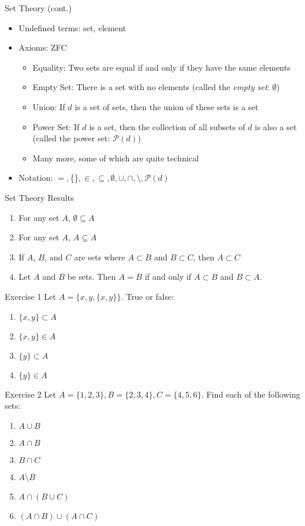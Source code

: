 \documentclass{beamer}
\begin{document}
\begin{frame}{Set Theory (cont.)}
\begin{itemize}
\item Undefined terms: set, element
\item Axioms: ZFC
\begin{itemize}
\item Equality: Two sets are equal if and only if they have the same elements
\item Empty Set: There is a set with no elements (called the \emph{empty set}: $\emptyset$)
\item Union: If $d$ is a set of sets, then the union of these sets is a set
\item Power Set: If $d$ is a set, then the collection of all subsets of $d$ is also a set (called the power set: $\mathcal{P}(d)$)
\item Many more, some of which are quite technical
\end{itemize}
\item Notation: $=, $\{\}$, \in, \subseteq, \emptyset, \cup, \cap, \setminus, \mathcal{P}(d)$
\end{itemize}
\end{frame}

\begin{frame}{Set Theory Results}
\begin{enumerate}
\item For any set $A$, $\emptyset \subseteq A$
\item For any set $A$, $A\subseteq A$
\item If $A$, $B$, and $C$ are sets where $A\subset B$ and $B\subset C$, then $A\subset C$
\item Let $A$ and $B$ be sets. Then $A=B$ if and only if $A\subset B$ and $B\subset A$.
\end{enumerate}
\end{frame}

\begin{frame}{Exercise 1}
Let $A = \{x,y,\{x,y\}\}$. True or false:
\begin{enumerate}
\item $\{x,y\}\subset A$
\item $\{x,y\}\in A$
\item $\{y\}\subset A$
\item $\{y\}\in A$
\end{enumerate}
\end{frame}

\begin{frame}{Exercise 2}
Let $A = \{1,2,3\}, B = \{2,3,4\}, C = \{4,5,6\}$. Find each of the following sets:
\begin{enumerate}
\item $A\cup B$
\item $A\cap B$
\item $B\cap C$
\item $A\setminus B$
\item $A\cap (B\cup C)$
\item $(A\cap B)\cup (A\cap C)$
\end{enumerate}
\end{frame}
\end{document}
